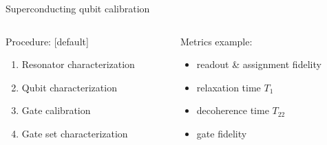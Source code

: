 \documentclass[aspectratio=169,10pt]{beamer}
\begin{document}
\begin{frame}{Superconducting qubit calibration}
{    \begin{minipage}[b]{\textwidth}
      \centering
      \begin{columns}
        \begin{column}{0.4\textwidth}
          Procedure:
          [default]
          \begin{enumerate}[leftmargin=*, label=\arabic*.]
            \item Resonator characterization
            \item Qubit characterization
            \item Gate calibration
            \item Gate set characterization
          \end{enumerate}
        \end{column}
        \begin{column}{0.4\textwidth}
          Metrics example:
          \begin{itemize}[label={\raisebox{0.2ex}{\tiny$\bullet$}}]
            \item readout \& assignment fidelity
            \item relaxation time $T_1$
            \item decoherence time $T_22$
            \item gate fidelity
          \end{itemize}   
        \end{column}
      \end{columns}
    \end{minipage}
    \vspace{1em}
  }
\end{frame}
\end{document}
